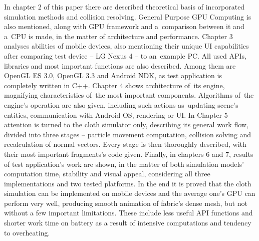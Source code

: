 In chapter 2 of this paper there are described theoretical basis of incorporated simulation methods and collision resolving. General Purpose GPU Computing is also mentioned, along with GPU framework and a~comparison between it and a~CPU is made, in the matter of architecture and performance. Chapter 3 analyses abilities of mobile devices, also mentioning their unique UI capabilities after comparing test device -- LG Nexus 4 -- to an~example PC. All used APIs, libraries and most important functions are also described. Among them are OpenGL ES 3.0, OpenGL 3.3 and Android NDK, as test application is completely written in C++. Chapter 4 shows architecture of~its engine, magnifying characteristics of~the most important components. Algorithms of~the engine's operation are also given, including such actions as~updating scene's entities, communication with Android OS, rendering or UI. In Chapter 5 attention is turned to the cloth simulator only, describing its general work flow, divided into three stages -- particle movement computation, collision solving and recalculation of normal vectors. Every stage is then thoroughly described, with their most important fragments's code given. Finally, in chapters 6 and 7, results of test application's work are shown, in the matter of both simulation models' computation time, stability and visual appeal, considering all three implementations and two tested platforms. In the end it is proved that the cloth simulation can be implemented on mobile devices and the average one's GPU can perform very well, producing smooth animation of fabric's dense mesh, but not without a few important limitations. These include less useful API functions and shorter work time on battery as a result of intensive computations and tendency to overheating.